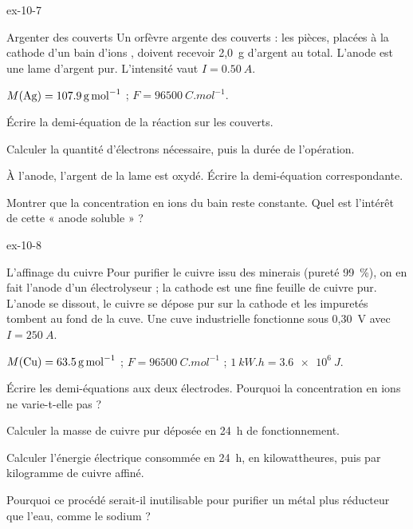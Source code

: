 \begin{blocLivre}{ex-10-7}
\begin{exercice}[2]{Argenter des couverts}
Un orfèvre argente des couverts : les pièces, placées à la cathode d'un bain d'ions , doivent recevoir 2,0~g
d'argent au total. L'anode est une lame d'argent pur. L'intensité vaut $I=\qty{0,50}{A}$.
\begin{donnees}
$M(\ce{Ag})=\qty{107,9}{g.mol^{-1}}$ ; $F=\qty{96500}{C.mol^{-1}}$.
\end{donnees}
\begin{questions}
\item Écrire la demi-équation de la réaction sur les couverts.
\item Calculer la quantité d'électrons nécessaire, puis la durée de l'opération.
\item À l'anode, l'argent de la lame est oxydé. Écrire la demi-équation correspondante.
\item Montrer que la concentration en ions  du bain reste constante. Quel est l'intérêt de cette « anode
soluble » ?
\end{questions}
\end{exercice}
\end{blocLivre}
\begin{blocLivre}{ex-10-8}
\begin{exercice}[2]{L'affinage du cuivre}
Pour purifier le cuivre issu des minerais (pureté 99~\%), on en fait l'anode d'un électrolyseur ; la cathode est une
fine feuille de cuivre pur. L'anode se dissout, le cuivre se dépose pur sur la cathode et les impuretés tombent au
fond de la cuve. Une cuve industrielle fonctionne sous 0,30~V avec $I=\qty{250}{A}$.
\begin{donnees}
$M(\ce{Cu})=\qty{63,5}{g.mol^{-1}}$ ; $F=\qty{96500}{C.mol^{-1}}$ ; $\qty{1}{kW.h}=\qty{3,6e6}{J}$.
\end{donnees}
\begin{questions}
\item Écrire les demi-équations aux deux électrodes. Pourquoi la concentration en ions  ne varie-t-elle
pas ?
\item Calculer la masse de cuivre pur déposée en 24~h de fonctionnement.
\item Calculer l'énergie électrique consommée en 24~h, en kilowattheures, puis par kilogramme de cuivre affiné.
\item Pourquoi ce procédé serait-il inutilisable pour purifier un métal plus réducteur que l'eau, comme le sodium ?
\end{questions}
\end{exercice}
\end{blocLivre}
